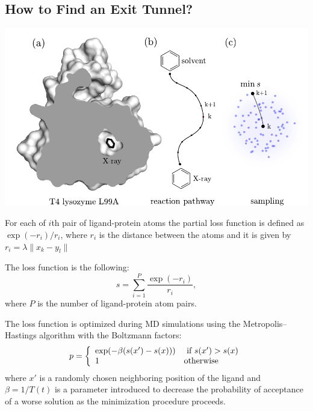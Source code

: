 \documentclass[a0,portrait]{a0poster}
\begin{document}
\begin{multicols}{2}
\large
  \section*{\huge\centering\color{myblue}How to Find an Exit Tunnel?}
\vspace*{1cm}
\begin{minipage}[b]{\linewidth}
  \centering
  \includegraphics[width=32cm]{../fig/fig_1.pdf}
\end{minipage}

  \vspace{1cm}
\begin{minipage}[b]{\linewidth}
  
For each of $i$th pair of ligand-protein atoms the partial loss function is 
defined as $\exp(-r_i)/r_i$, where $r_i$ is the distance between the atoms 
and it is given by $r_i = \lambda \parallel x_k - y_l \parallel $

The loss function is the following:
\begin{equation}
    s = \sum^P_{i=1} \frac{\exp(-r_i)}{r_i},
\end{equation}
\vspace*{1cm}
where $P$ is the number of ligand-protein atom pairs.
    
\vspace*{1cm}
      
The loss function is optimized during MD simulations using the 
Metropolis–Hastings algorithm with the Boltzmann factors:
\begin{equation}
    p =  \left\{ \begin{array}{ll}
         \exp(-\beta (s(x')-s(x))) & \textnormal{ if } s(x') > s(x)\\
         1 & \textnormal{otherwise}
  \end{array} \right.
\end{equation}
where $x'$ is a randomly chosen neighboring position of the ligand 
and $\beta = 1/T(t)$ is a parameter introduced to decrease the 
probability of acceptance of a worse solution as the minimization 
procedure proceeds.
        

\end{minipage}
\end{multicols}
\end{document}
